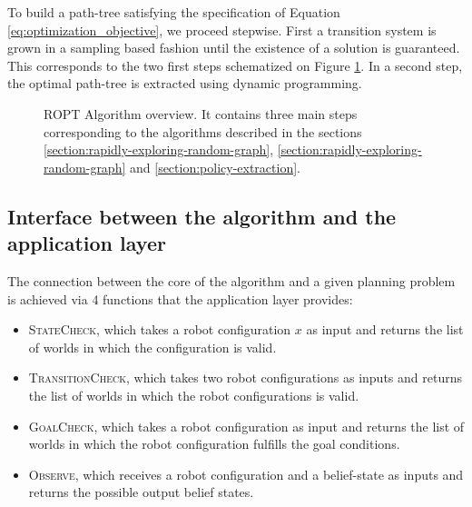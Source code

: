 \documentclass[letterpaper, 10 pt, conference]{ieeeconf}  %
\begin{document}
To build a path-tree satisfying the specification of Equation \ref{eq:optimization_objective}, we proceed stepwise. First a transition system is grown in a sampling based fashion until the existence of a solution is guaranteed. This corresponds to the two first steps schematized on Figure \ref{algorithm_overview}. In a second step, the optimal path-tree is extracted using dynamic programming. 

\begin{figure}[!htb]
\scriptsize
{}
 \caption{ROPT Algorithm overview. It contains three main steps corresponding to the algorithms described in the sections \ref{section:rapidly-exploring-random-graph}, \ref{section:rapidly-exploring-random-graph} and \ref{section:policy-extraction}.}
 \label{algorithm_overview}
\end{figure}

\subsection{Interface between the algorithm and the application layer}

The connection between the core of the algorithm and a given planning problem is achieved via 4 functions that the application layer provides: 
\begin{itemize}
\item \textsc{StateCheck}, which takes a robot configuration $x$ as input and returns the list of worlds in which the configuration is valid.
\item \textsc{TransitionCheck}, which takes two robot configurations as inputs and returns the list of worlds in which the robot configurations is valid.
\item \textsc{GoalCheck}, which takes a robot configuration as input and returns the list of worlds in which the robot configuration fulfills the goal conditions.
\item \textsc{Observe}, which receives a robot configuration and a belief-state as inputs and returns the possible output belief states. %
\end{itemize}
\end{document}
